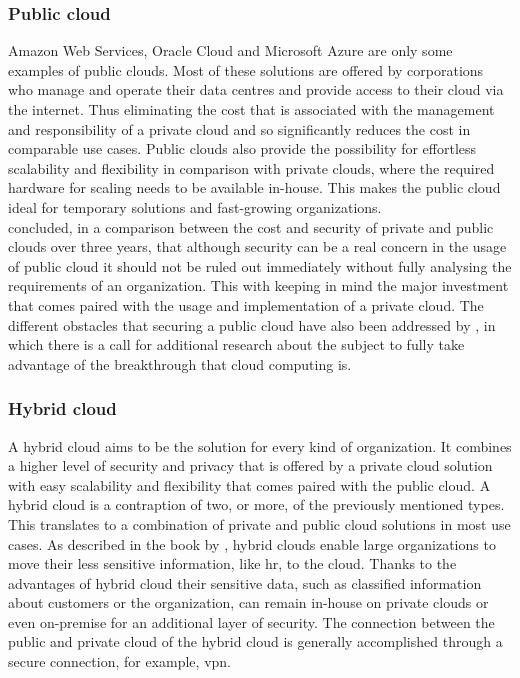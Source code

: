 \subsubsection{Public cloud}
Amazon Web Services, Oracle Cloud and Microsoft Azure are only some examples of public clouds. Most of these solutions are offered by corporations who manage and operate their data centres and provide access to their cloud via the internet. Thus eliminating the cost that is associated with the management and responsibility of a private cloud and so significantly reduces the cost in comparable use cases. Public clouds also provide the possibility for effortless scalability and flexibility in comparison with private clouds, where the required hardware for scaling needs to be available in-house. This makes the public cloud ideal for temporary solutions and fast-growing organizations.
\\
\textcite{Singh2012} concluded, in a comparison between the cost and security of private and public clouds over three years, that although security can be a real concern in the usage of public cloud it should not be ruled out immediately without fully analysing the requirements of an organization. This with keeping in mind the major investment that comes paired with the usage and implementation of a private cloud.  
The different obstacles that securing a public cloud have also been addressed by \textcite{Ren2012}, in which there is a call for additional research about the subject to fully take advantage of the breakthrough that cloud computing is. 

\subsubsection{Hybrid cloud}
A hybrid cloud aims to be the solution for every kind of organization. It combines a higher level of security and privacy that is offered by a private cloud solution with easy scalability and flexibility that comes paired with the public cloud. A hybrid cloud is a contraption of two, or more, of the previously mentioned types. This translates to a combination of private and public cloud solutions in most use cases. As described in the book by \textcite{Sarna2010}, hybrid clouds enable large organizations to move their less sensitive information, like \acrfull{hr}, to the cloud. Thanks to the advantages of hybrid cloud their sensitive data, such as classified information about customers or the organization, can remain in-house on private clouds or even on-premise for an additional layer of security. The connection between the public and private cloud of the hybrid cloud is generally accomplished through a secure connection, for example, \acrfull{vpn}.


